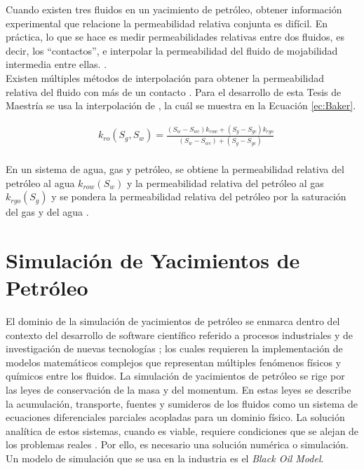 Cuando existen tres fluidos en un yacimiento de petróleo, obtener información experimental que relacione la permeabilidad relativa conjunta es difícil. En práctica, lo que se hace es medir permeabilidades relativas entre dos fluidos, es decir, los ``contactos'', e interpolar la permeabilidad del fluido de mojabilidad intermedia entre ellas. \citep{Zuo2014}.\\

Existen múltiples métodos de interpolación para obtener la permeabilidad relativa del fluido con más de un contacto \citep{Delshad1989, Blunt2000, Zuo2014}. Para el desarrollo de esta Tesis de Maestría se usa la interpolación de \cite{Baker1988}, la cuál se muestra en la Ecuación \ref{ec:Baker}.

\begin{align}
	\label{ec:Baker}&k_{ro}(S_{g}, S_{w}) = \frac{\left(S_{w}-S_{wc}\right)k_{row} + \left(S_{g}-S_{gc}\right)k_{rgo}}{\left(S_{w}-S_{wc}\right) + \left(S_{g}-S_{gc}\right)}
\end{align}\\

En un sistema de agua, gas y petróleo, se obtiene la permeabilidad relativa del petróleo al agua $k_{row}(S_{w})$ y la permeabilidad relativa del petróleo al gas $k_{rgo}(S_{g})$ y se pondera la permeabilidad relativa del petróleo por la saturación del gas y del agua \citep{Baker1988}.

\section{Simulación de Yacimientos de Petróleo}\label{sec:Simulation}
El dominio de la simulación de yacimientos de petróleo se enmarca dentro del contexto del desarrollo de software científico referido a procesos industriales y de investigación de nuevas tecnologías \citep{Kelly2015}; los cuales requieren la implementación de modelos matemáticos complejos que representan múltiples fenómenos físicos y químicos entre los fluidos. La simulación de yacimientos de petróleo se rige por las leyes de conservación de la masa y del momentum. En estas leyes se describe la acumulación, transporte, fuentes y sumideros de los fluidos como un sistema de ecuaciones diferenciales parciales acopladas para un dominio físico. La solución analítica de estos sistemas, cuando es viable, requiere condiciones que se alejan de los problemas reales \citep{ertekin2001basic}. Por ello, es necesario una solución numérica o simulación. Un modelo de simulación que se usa en la industria es el \textit{Black Oil Model}.%


